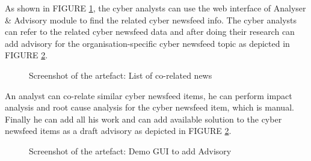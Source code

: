  As shown in FIGURE \ref{fig:tag-intel}, 
 the cyber analysts can use the web interface of Analyser \& Advisory module 
 to find the related cyber newsfeed info.
 The cyber analysts can refer to the related cyber newsfeed data 
 and after doing their research can add advisory for the organisation-specific cyber newsfeed topic 
 as depicted in FIGURE 
 \ref{fig:add-advisory}. 
 
\begin{figure}[ht]
    \centering
    \caption{Screenshot of the artefact: List of co-related news}
    \label{fig:tag-intel}
\end{figure}
 \FloatBarrier
 
 

An analyst can co-relate similar cyber newsfeed items, 
he can perform impact analysis and root cause analysis for the cyber newsfeed item, which is manual. 
Finally he can add all his work and can add available solution to the cyber newsfeed items as a draft advisory as depicted in FIGURE \ref{fig:add-advisory}.

\begin{figure}[ht]
    \centering
    \caption{Screenshot of the artefact: Demo GUI to add Advisory}
    \label{fig:add-advisory}
\end{figure}
 \FloatBarrier


